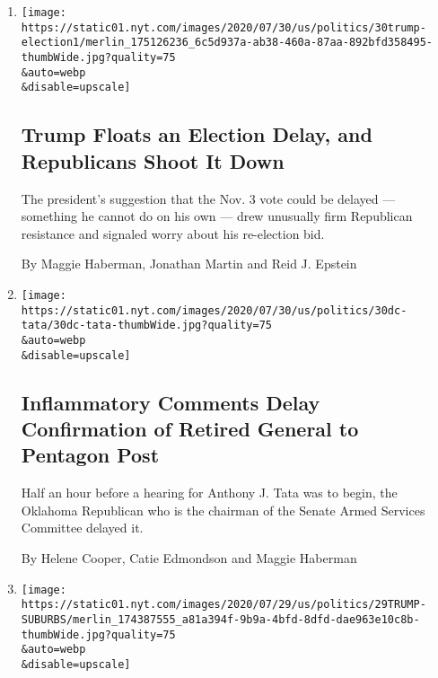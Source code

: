 \begin{enumerate}
\def\labelenumi{\arabic{enumi}.}
\item
  \href{/2020/07/30/us/politics/trump-delay-2020-election.html}{}

  \texttt{[image: https://static01.nyt.com/images/2020/07/30/us/politics/30trump-election1/merlin\_175126236\_6c5d937a-ab38-460a-87aa-892bfd358495-thumbWide.jpg?quality=75\\\&auto=webp\\\&disable=upscale]}

  \hypertarget{trump-floats-an-election-delay-and-republicans-shoot-it-down}{%
  \subsection{Trump Floats an Election Delay, and Republicans Shoot It
  Down}\label{trump-floats-an-election-delay-and-republicans-shoot-it-down}}

  The president's suggestion that the Nov. 3 vote could be delayed ---
  something he cannot do on his own --- drew unusually firm Republican
  resistance and signaled worry about his re-election bid.

  By Maggie Haberman, Jonathan Martin and Reid J. Epstein
\item
  \href{/2020/07/30/us/politics/trump-inhofe-tata-pentagon.html}{}

  \texttt{[image: https://static01.nyt.com/images/2020/07/30/us/politics/30dc-tata/30dc-tata-thumbWide.jpg?quality=75\\\&auto=webp\\\&disable=upscale]}

  \hypertarget{inflammatory-comments-delay-confirmation-of-retired-general-to-pentagon-post}{%
  \subsection{Inflammatory Comments Delay Confirmation of Retired
  General to Pentagon
  Post}\label{inflammatory-comments-delay-confirmation-of-retired-general-to-pentagon-post}}

  Half an hour before a hearing for Anthony J. Tata was to begin, the
  Oklahoma Republican who is the chairman of the Senate Armed Services
  Committee delayed it.

  By Helene Cooper, Catie Edmondson and Maggie Haberman
\item
  \href{/2020/07/29/us/politics/trump-suburbs-housing-white-voters.html}{}

  \texttt{[image: https://static01.nyt.com/images/2020/07/29/us/politics/29TRUMP-SUBURBS/merlin\_174387555\_a81a394f-9b9a-4bfd-8dfd-dae963e10c8b-thumbWide.jpg?quality=75\\\&auto=webp\\\&disable=upscale]}


\end{enumerate}
